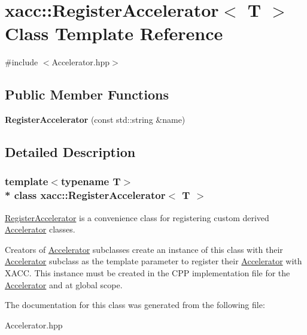 \hypertarget{a00052}{}\section{xacc\+:\+:Register\+Accelerator$<$ T $>$ Class Template Reference}
\label{a00052}


{\ttfamily \#include $<$Accelerator.\+hpp$>$}

\subsection*{Public Member Functions}
\begin{DoxyCompactItemize}
\item 
{\bfseries Register\+Accelerator} (const std\+::string \&name)\hypertarget{a00052_a329df136d447a887e9794ea078d04706}{}\label{a00052_a329df136d447a887e9794ea078d04706}

\end{DoxyCompactItemize}


\subsection{Detailed Description}
\subsubsection*{template$<$typename T$>$\\*
class xacc\+::\+Register\+Accelerator$<$ T $>$}

\hyperlink{a00052}{Register\+Accelerator} is a convenience class for registering custom derived \hyperlink{a00011}{Accelerator} classes.

Creators of \hyperlink{a00011}{Accelerator} subclasses create an instance of this class with their \hyperlink{a00011}{Accelerator} subclass as the template parameter to register their \hyperlink{a00011}{Accelerator} with X\+A\+CC. This instance must be created in the C\+PP implementation file for the \hyperlink{a00011}{Accelerator} and at global scope. 

The documentation for this class was generated from the following file\+:\begin{DoxyCompactItemize}
\item 
Accelerator.\+hpp\end{DoxyCompactItemize}
